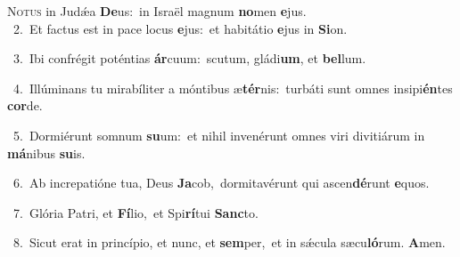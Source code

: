 \lettrine{\initial\textcolor{\initialcolor}{N}}{otus} in Judǽa \textbf{De}\-us:~\star in Israël magnum \textbf{no}\-men \textbf{e}\-jus.\\
{\numbfont\textcolor{\numbcolor}{~2.}}~Et factus est in pace locus \textbf{e}\-jus:~\star et habitátio \textbf{e}\-jus in \textbf{Si}\-on.\par
{\numbfont\textcolor{\numbcolor}{~3.}}~Ibi confrégit poténtias \textbf{ár}\-cuum:~\star scutum, gládi\-\textbf{um}\-, et \textbf{bel}\-lum.\par
{\numbfont\textcolor{\numbcolor}{~4.}}~Illúminans tu mirabíliter a móntibus æ\-\textbf{tér}\-nis:~\star turbáti sunt omnes insipi\-\textbf{én}\-tes \textbf{cor}\-de.\par
{\numbfont\textcolor{\numbcolor}{~5.}}~Dormiérunt somnum \textbf{su}\-um:~\star et nihil invenérunt omnes viri divitiárum in \textbf{má}\-nibus \textbf{su}\-is.\par
{\numbfont\textcolor{\numbcolor}{~6.}}~Ab increpatióne tua, Deus \textbf{Ja}\-cob,~\star dormitavérunt qui ascen\-\textbf{dé}\-runt \textbf{e}\-quos.\par
{\numbfont\textcolor{\numbcolor}{~7.}}~Glória Patri, et \textbf{Fí}\-lio,~\star et Spi\-\textbf{rí}\-tui \textbf{Sanc}\-to.\par
{\numbfont\textcolor{\numbcolor}{~8.}}~Sicut erat in princípio, et nunc, et \textbf{sem}\-per,~\star et in sǽcula sæcu\-\textbf{ló}\-rum. \textbf{A}\-men.\par
